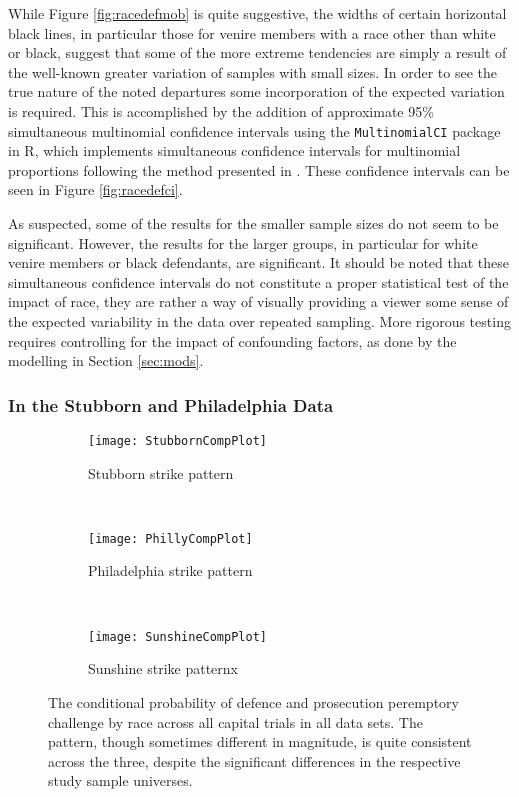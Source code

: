 While Figure \ref{fig:racedefmob} is quite suggestive, the widths of certain horizontal black lines, in particular those for
venire members with a race other than white or black, suggest that some of the more extreme tendencies are simply a result
of the well-known greater variation of samples with small sizes. In order to see the true nature of the noted departures some
incorporation of the expected variation is required. This is accomplished by the addition of
approximate 95\% simultaneous multinomial confidence intervals using the \texttt{MultinomialCI} package in R, which implements
simultaneous confidence intervals for multinomial proportions following the method presented in \cite{sison1995}. These confidence
intervals can be seen in Figure \ref{fig:racedefci}.

As suspected, some of the results for the smaller sample sizes do not seem to be significant. However, the results for the larger groups,
in particular for white venire members or black defendants, are significant. It should be noted that these simultaneous
confidence intervals do not constitute a proper statistical test of the impact of race, they are rather a way of visually
providing a viewer some sense of the expected variability in the data over repeated sampling. More rigorous testing requires
controlling for the impact of confounding factors, as done by the modelling in Section \ref{sec:mods}.

\subsubsection{In the Stubborn and Philadelphia Data}

\begin{figure}[h!]
  \centering
  \begin{subfigure}{0.32\textwidth}
    \texttt{[image: StubbornCompPlot]}
    \caption{\footnotesize Stubborn strike pattern}
    \label{fig:stubcomp}
  \end{subfigure}
  ~
  \begin{subfigure}{0.32\textwidth}
    \texttt{[image: PhillyCompPlot]}
    \caption{\footnotesize Philadelphia strike pattern}
    \label{fig:philcomp}
  \end{subfigure}
  ~
  \begin{subfigure}{0.32\textwidth}
    \texttt{[image: SunshineCompPlot]}
    \caption{\footnotesize Sunshine strike patternx}
    \label{fig:suncomp}
  \end{subfigure}
  \caption[Strikes by Racial Combination (All Capital Trial Data)]
  {\footnotesize The conditional probability of defence and prosecution peremptory challenge by race across all
    capital trials in all data sets. The pattern, though sometimes different in magnitude, is quite consistent across the three,
    despite the significant differences in the respective study sample universes.}
  \label{fig:racedefalldata}
\end{figure}

